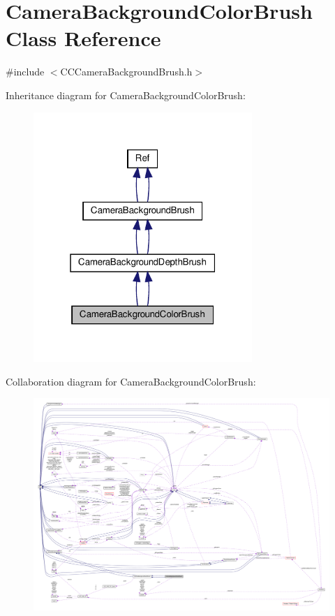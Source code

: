 \hypertarget{classCameraBackgroundColorBrush}{}\section{Camera\+Background\+Color\+Brush Class Reference}
\label{classCameraBackgroundColorBrush}


{\ttfamily \#include $<$C\+C\+Camera\+Background\+Brush.\+h$>$}



Inheritance diagram for Camera\+Background\+Color\+Brush\+:
\nopagebreak
\begin{figure}[H]
\begin{center}
\leavevmode
\includegraphics[width=235pt]{classCameraBackgroundColorBrush__inherit__graph}
\end{center}
\end{figure}


Collaboration diagram for Camera\+Background\+Color\+Brush\+:
\nopagebreak
\begin{figure}[H]
\begin{center}
\leavevmode
\includegraphics[width=350pt]{classCameraBackgroundColorBrush__coll__graph}
\end{center}
\end{figure}
